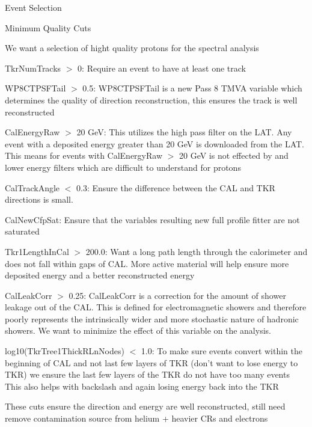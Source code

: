 \documentclass{article}
\begin{document}
\begin{myEnumerate}
\begin{myEnumerate}
			\end{myEnumerate}
		\item Event Selection
			\begin{myEnumerate}
				\item Minimum Quality Cuts
				\begin{myEnumerate}
					\item We want a selection of hight quality protons for the spectral analysis
					\item TkrNumTracks $>$ 0: Require an event to have at least one track
					\item WP8CTPSFTail $>$ 0.5: WP8CTPSFTail is a new Pass 8 TMVA variable which determines the quality of direction reconstruction, this ensures the track is well reconstructed
					\item CalEnergyRaw $>$ 20 GeV: This utilizes the high pass filter on the LAT.  Any event with a deposited energy greater than 20 GeV is downloaded from the LAT.  This means for events with CalEnergyRaw $>$ 20 GeV is not effected by and lower energy filters which are difficult to understand for protons
					\item CalTrackAngle $<$ 0.3: Ensure the difference between the CAL and TKR directions is small.
					\item CalNewCfpSat: Ensure that the variables resulting new full profile fitter are not saturated
					\item Tkr1LengthInCal $>$ 200.0: Want a long path length through the calorimeter and does not fall within gaps of CAL.  More active material will help ensure more deposited energy and a better reconstructed energy
					\item CalLeakCorr $>$ 0.25: CalLeakCorr is a correction for the amount of shower leakage out of the CAL.  This is defined for electromagnetic showers and therefore poorly represents the intrinsically wider and more stochastic nature of hadronic showers.  We want to minimize the effect of this variable on the analysis.  
					\item log10(TkrTree1ThickRLnNodes) $<$ 1.0: To make sure events convert within the beginning of CAL and not last few layers of TKR (don't want to lose energy to TKR) we ensure the last few layers of the TKR do not have too many events  This also helps with backslash and again losing energy back into the TKR
					\item These cuts ensure the direction and energy are well reconstructed, still need remove contamination source from helium + heavier CRs and electrons
				\end{myEnumerate}

\end{myEnumerate}
\end{myEnumerate}
\end{document}
